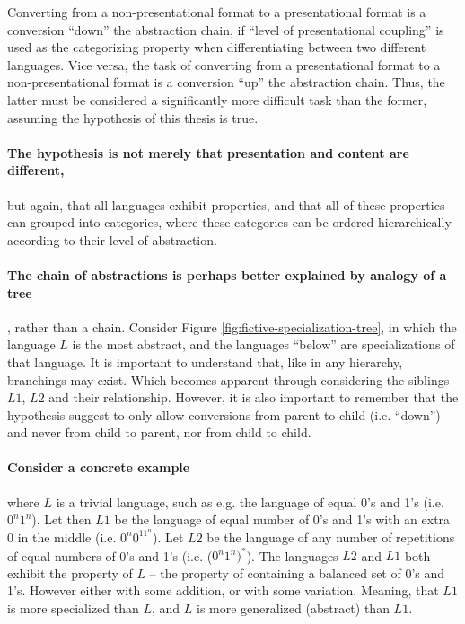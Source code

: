 \documentclass{scrreprt}
\begin{document}
Converting from a non-presentational format to a presentational format is a conversion ``down'' the abstraction chain, if ``level of presentational coupling'' is used as the categorizing property when differentiating between two different languages. Vice versa, the task of converting from a presentational format to a non-presentational format is a conversion ``up'' the abstraction chain. Thus, the latter must be considered a significantly more difficult task than the former, assuming the hypothesis of this thesis is true.

\paragraph{The hypothesis is not merely that presentation and content are different,} but again, that all languages exhibit properties, and that all of these properties can grouped into categories, where these categories can be ordered hierarchically according to their level of abstraction.

\paragraph{The chain of abstractions is perhaps better explained by analogy of a tree}, rather than a chain. Consider Figure \ref{fig:fictive-specialization-tree}, in which the language $L$ is the most abstract, and the languages ``below'' are specializations of that language. It is important to understand that, like in any hierarchy, branchings may exist. Which becomes apparent through considering the siblings $L1$, $L2$ and their relationship. However, it is also important to remember that the hypothesis suggest to only allow conversions from parent to child (i.e. ``down'') and never from child to parent, nor from child to child.

\paragraph{Consider a concrete example} where $L$ is a trivial language, such as e.g. the language of equal 0's and 1's (i.e. $0^n1^n$). Let then $L1$ be the language of equal number of 0's and 1's with an extra 0 in the middle (i.e. $0^n0^11^n$). Let $L2$ be the language of any number of repetitions of equal numbers of 0's and 1's (i.e. ($0^n1^n)^*$). The languages $L2$ and $L1$ both exhibit the property of $L$ -- the property of containing a balanced set of 0's and 1's. However either with some addition, or with some variation. Meaning, that $L1$ is more specialized than $L$, and $L$ is more generalized (abstract) than $L1$.
\end{document}
